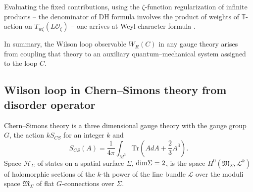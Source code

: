 \documentclass[12pt]{article}
\numberwithin{equation}{section}
\newcommand\beq{\begin{equation}}
\newcommand\eeq{\end{equation}}
\theoremstyle{definition}
\newcommand {\BT}   {\mathbb T}
\newcommand {\CalA} {\mathcal A}
\newcommand {\CalG} {\mathcal G}
\newcommand {\CalH} {\mathcal H}
\newcommand {\CalL} {\mathcal L}
\newcommand {\CalO} {\mathcal O}
\newcommand {\ii} {\mathrm{i}}
\newcommand{\Tr}{\text{Tr}}
\begin{document}
Evaluating
the fixed contributions, using the $\zeta$-function regularization of infinite products -- the denominator of DH formula involves the product
of weights of ${\BT}$-action on $T_{w \xi}\left( L{\CalO}_{\xi} \right)$ -- one arrives at Weyl character formula \cite{HW}. 

In summary, the Wilson loop observable $W_{R}(C)$ in any gauge theory
arises from coupling that theory to an auxiliary quantum--mechanical system assigned to the loop $C$. 
\subsection{Wilson loop in Chern--Simons theory from disorder operator}

Chern--Simons theory is a three dimensional gauge theory with the gauge group $G$, the action $k S_{CS}$
for an integer $k$ and
\beq
S_{CS}(A) = \frac{1}{4\pi} \int_{M^3} {\Tr} \left( A dA + \frac{2}{3} A^{3} \right).
\label{eq:cs3}
\eeq
Space ${\CalH}_{\Sigma}$ of states on 
a spatial surface $\Sigma$, ${\rm dim}{\Sigma}=2$, is the space $H^{0}({\mathfrak{M}}_{\Sigma}, {\CalL}^{k})$ of holomorphic sections of the $k$-th power of the line bundle
${\CalL}$ over the moduli space ${\mathfrak{M}}_{\Sigma}$ of flat $G$-connections over ${\Sigma}$.
\end{document}
